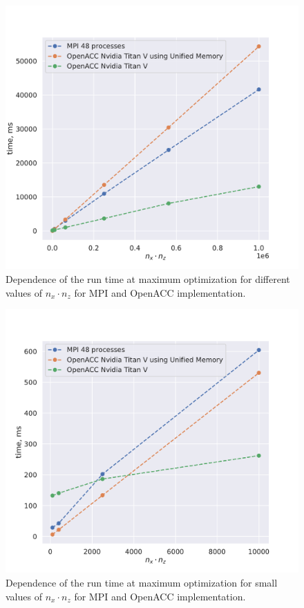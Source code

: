 \documentclass[a4paper,12pt]{article}
\begin{document}
\begin{figure}[H]
    \centering
    \includegraphics[width=\textwidth]{../img/time.pdf}
    \caption{Dependence of the run time at maximum
    optimization for different values of $n_x \cdot n_z$
    for MPI and OpenACC implementation.}
\end{figure}

\begin{figure}[H]
    \centering
    \includegraphics[width=\textwidth]{../img/time-small.pdf}
    \caption{Dependence of the run time at maximum
    optimization for small values of $n_x \cdot n_z$
    for MPI and OpenACC implementation.}
\end{figure}
    
\end{document}
